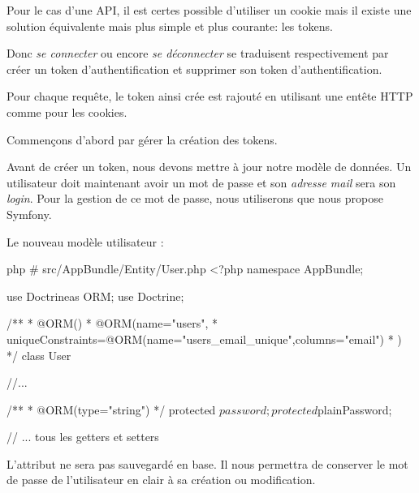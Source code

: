 \documentclass[big]{zmdocument}
\begin{document}
Pour le cas d'une API, il est certes possible d'utiliser un cookie mais il existe une solution équivalente mais plus simple et plus courante: les tokens.



\begin{Information}
Donc \textit{se connecter} ou encore \textit{se déconnecter} se traduisent respectivement par créer un token d'authentification et supprimer son token d'authentification.
\end{Information}


Pour chaque requête, le token ainsi crée est rajouté en utilisant une entête HTTP comme pour les cookies.



Commençons d'abord par gérer la création des tokens.





Avant de créer un token, nous devons mettre à jour notre modèle de données. Un utilisateur doit maintenant avoir un mot de passe et son \textit{adresse mail} sera son \textit{login}.
Pour la gestion de ce mot de passe, nous utiliserons  que nous propose Symfony.



Le nouveau modèle utilisateur :



\begin{CodeBlock}{php}
# src/AppBundle/Entity/User.php
<?php
namespace AppBundle\Entity;

use Doctrine\ORM\Mapping as ORM;
use Doctrine\Common\Collections\ArrayCollection;

/**
* @ORM\Entity()
* @ORM\Table(name="users",
*      uniqueConstraints={@ORM\UniqueConstraint(name="users_email_unique",columns={"email"})}
* )
*/
class User
{
    //...
    
    /**
     * @ORM\Column(type="string")
     */
    protected $password;

    protected $plainPassword;

    // ... tous les getters et setters
}
\end{CodeBlock}



L'attribut  ne sera pas sauvegardé en base. Il nous permettra de
conserver le mot de passe de l'utilisateur en clair à sa création ou modification.
\end{document}
